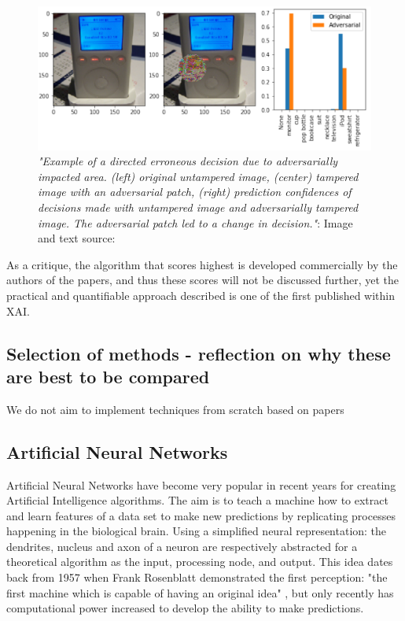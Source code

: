 \documentclass[proposal]{softeng}
\begin{document}
\begin{figure}[h!]
\centering
  \includegraphics[width=.8\textwidth]{images/decision_change.png}
  \caption{\textit{"Example of a directed erroneous decision due to adversarially impacted area. (left) original
untampered image, (center) tampered image with an adversarial patch, (right) prediction confidences
of decisions made with untampered image and adversarially tampered image. The adversarial patch
led to a change in decision."}: Image and text source: \cite{LinZhongQiu2019DERD}}
  \label{fig:decision_change}
\end{figure}

As a critique, the algorithm that scores highest is developed commercially by the authors of the papers, and thus these scores will not be discussed further, yet the practical and quantifiable approach described is one of the first published within XAI.


\subsection{Selection of methods - reflection on why these are best to be compared}
 We do not aim to implement techniques from scratch based on papers

\subsection{Artificial Neural Networks}

Artificial Neural Networks have become very popular in recent years for creating Artificial Intelligence algorithms. The aim is to teach a machine how to extract and learn features of a data set to make new predictions by replicating processes happening in the biological brain. Using a simplified neural representation: the dendrites, nucleus and axon of a neuron are respectively abstracted for a theoretical algorithm as the input, processing node, and output. This idea dates back from 1957 when Frank Rosenblatt demonstrated the first perception: "the first machine which is capable of having an original idea" \cite{rosenblatt}, but only recently has computational  power increased to develop the ability to make predictions.
\end{document}
